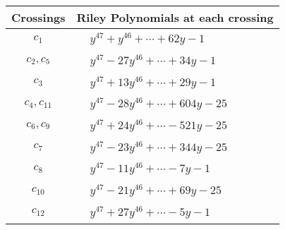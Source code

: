 \documentclass[1p]{elsarticle_modified}
\theoremstyle{definition}
\begin{document}
\begin{tabular}{m{50pt}|m{274pt}}
Crossings & \hspace{64pt}Riley Polynomials at each crossing \\
\hline $$\begin{aligned}c_{1}\end{aligned}$$&$\begin{aligned}
&y^{47}+y^{46}+\cdots+62 y-1
\end{aligned}$\\
\hline $$\begin{aligned}c_{2},c_{5}\end{aligned}$$&$\begin{aligned}
&y^{47}-27 y^{46}+\cdots+34 y-1
\end{aligned}$\\
\hline $$\begin{aligned}c_{3}\end{aligned}$$&$\begin{aligned}
&y^{47}+13 y^{46}+\cdots+29 y-1
\end{aligned}$\\
\hline $$\begin{aligned}c_{4},c_{11}\end{aligned}$$&$\begin{aligned}
&y^{47}-28 y^{46}+\cdots+604 y-25
\end{aligned}$\\
\hline $$\begin{aligned}c_{6},c_{9}\end{aligned}$$&$\begin{aligned}
&y^{47}+24 y^{46}+\cdots-521 y-25
\end{aligned}$\\
\hline $$\begin{aligned}c_{7}\end{aligned}$$&$\begin{aligned}
&y^{47}-23 y^{46}+\cdots+344 y-25
\end{aligned}$\\
\hline $$\begin{aligned}c_{8}\end{aligned}$$&$\begin{aligned}
&y^{47}-11 y^{46}+\cdots-7 y-1
\end{aligned}$\\
\hline $$\begin{aligned}c_{10}\end{aligned}$$&$\begin{aligned}
&y^{47}-21 y^{46}+\cdots+69 y-25
\end{aligned}$\\
\hline $$\begin{aligned}c_{12}\end{aligned}$$&$\begin{aligned}
&y^{47}+27 y^{46}+\cdots-5 y-1
\end{aligned}$\\
\hline
\end{tabular}\\~\\
\end{document}
